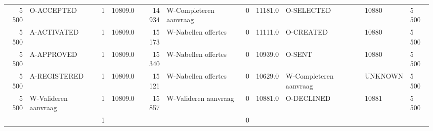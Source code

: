 \begin{tabular}{rlrlrlrllll}
5 500 & O-ACCEPTED & 1 & 10809.0 & 14 934 & W-Completeren aanvraag & 0 & 11181.0 & O-SELECTED & 10880 & 5 500 \\
5 500 & A-ACTIVATED & 1 & 10809.0 & 15 173 & W-Nabellen offertes & 0 & 11111.0 & O-CREATED & 10880 & 5 500 \\
5 500 & A-APPROVED & 1 & 10809.0 & 15 340 & W-Nabellen offertes & 0 & 10939.0 & O-SENT & 10880 & 5 500 \\
5 500 & A-REGISTERED & 1 & 10809.0 & 15 121 & W-Nabellen offertes & 0 & 10629.0 & W-Completeren aanvraag & UNKNOWN & 5 500 \\
5 500 & W-Valideren aanvraag & 1 & 10809.0 & 15 857 & W-Valideren aanvraag & 0 & 10881.0 & O-DECLINED & 10881 & 5 500 \\
 &  & 1 &  &  &  & 0 &  &  &  &  \\
\bottomrule
\end{tabular}
